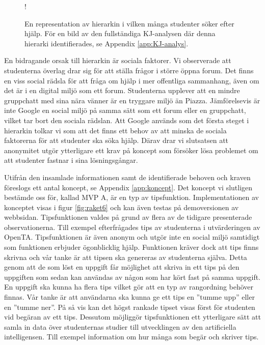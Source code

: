 \begin{figure}[hbtp]
    \centering
     {!} {
        
    }
    \caption{En representation av hierarkin i vilken många studenter söker efter hjälp. För en bild av den fullständiga KJ-analysen där denna hierarki identifierades, se Appendix \ref{app:KJ-analys}. }
    \label{fig:raket5}
\end{figure}

En bidragande orsak till hierarkin är sociala faktorer. Vi observerade att studenterna överlag drar sig för att ställa frågor i större öppna forum. Det finns en viss social rädsla för att fråga om hjälp i mer offentliga sammanhang, även om det är i en digital miljö som ett forum. Studenterna upplever att en mindre gruppchatt med sina nära vänner är en tryggare miljö än Piazza. Jämförelsevis är inte Google en social miljö på samma sätt som ett forum eller en gruppchatt, vilket tar bort den sociala rädslan. Att Google används som det första steget i hierarkin tolkar vi som att det finns ett behov av att minska de sociala faktorerna för att studenter ska söka hjälp. Därav drar vi slutsatsen att anonymitet utgör ytterligare ett krav på koncept som försöker lösa problemet om att studenter fastnar i sina lösningsgångar.


Utifrån den insamlade informationen samt de identifierade behoven och kraven föreslogs ett antal koncept, se Appendix \ref{app:koncept}. Det koncept vi slutligen bestämde oss för, kallad MVP A, är en typ av tipsfunktion. Implementationen av konceptet visas i figur \ref{fig:raket6} och kan även testas på demoversionen av webbsidan. Tipsfunktionen valdes på grund av flera av de tidigare presenterade observationerna. Till exempel efterfrågades tips av studenterna i utvärderingen av OpenTA. Tipsfunktionen är även anonym och utgör inte en social miljö samtidigt som funktionen erbjuder ögonblicklig hjälp. Funktionen kräver dock att tips finns skrivna och vår tanke är att tipsen ska genereras av studenterna själva. Detta genom att de som löst en uppgift får möjlighet att skriva in ett tips på den uppgiften som sedan kan användas av någon som har kört fast på samma uppgift. En uppgift ska kunna ha flera tips vilket gör att en typ av rangordning behöver finnas. Vår tanke är att användarna ska kunna ge ett tips en ''tumme upp'' eller en ''tumme ner''. På så vis kan det högst rankade tipset visas först för studenten vid begäran av ett tips. Dessutom möjliggör tipsfunktionen ett ytterligare sätt att samla in data över studenternas studier till utvecklingen av den artificiella intelligensen. Till exempel information om hur många som begär och skriver tips.

